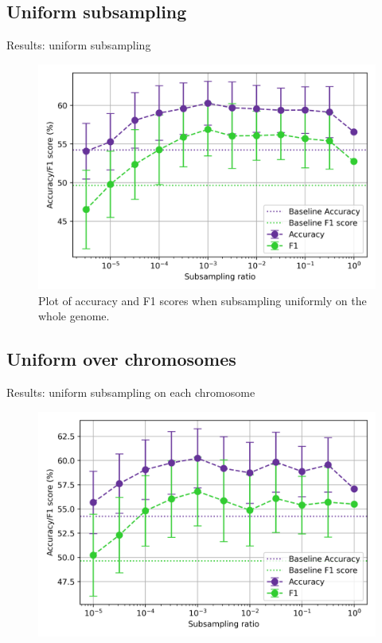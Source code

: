 \documentclass[aspectratio=169]{beamer}
\begin{document}
\subsection{Uniform subsampling}
\begin{frame}{Results: uniform subsampling}
\begin{figure}[H]
    \centering
    \includegraphics[height=0.5\textwidth]{../figures/subsample_plot.png}
    \caption{Plot of accuracy and F1 scores when subsampling uniformly on the whole genome.}
    \label{fig:res1a}
\end{figure}
\end{frame}

\subsection{Uniform over chromosomes}
\begin{frame}{Results: uniform subsampling on each chromosome}
\begin{figure}[H]
    \centering
    \includegraphics[height=0.5\textwidth]{../figures/uniform_sample_low_ratio.png}
    \label{fig:res1b}
\end{figure}
\end{frame}
\end{document}

